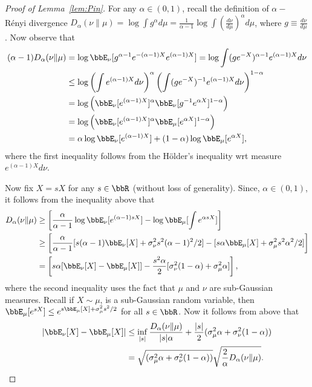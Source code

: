 \documentclass[11pt]{article}
\begin{document}
\begin{proof}[Proof of Lemma~\ref{lem:Pin}]
    For any $\alpha\in (0,1)$, recall the definition of $\alpha-$ R\'enyi divergence  $D_{\alpha}(\nu\|\mu)=   \log \int g^{\alpha}d\mu =\frac{1}{\alpha-1} {\log \int \left(\frac{d\nu}{d\mu}\right)^{\alpha}d\mu}   $, where $g\equiv \frac{d\nu}{d\mu}$. Now observe that
    \begin{align}
    \nonumber
       (\alpha-1) D_{\alpha}(\nu\| \mu) &= \log \bbE_{\nu}[ g^{\alpha-1} e^{-(\alpha-1)X} e^{(\alpha-1)X}  ] = \log \int (ge^{-X})^{\alpha-1}  e^{(\alpha-1)X} d\nu 
       \\
       \nonumber
       &\leq \log \left( \int   e^{(\alpha-1)X} d\nu \right)^{\alpha} \left(\int (ge^{-X})^{-1}  e^{(\alpha-1)X} d\nu \right)^{1-\alpha}
       \\
       \nonumber
       &= \log \left( \bbE_{\nu}[  e^{(\alpha-1)X}]^{\alpha} \bbE_{\nu}[g^{-1}  e^{\alpha X} ]^{1-\alpha} \right)
       \\
       \nonumber
       &= \log \left( \bbE_{\nu}[  e^{(\alpha-1)X}]^{\alpha} \bbE_{\mu}[ e^{\alpha X} ]^{1-\alpha} \right)
       \\
       &= \alpha \log \bbE_{\nu}[  e^{(\alpha-1)X}] + (1-\alpha) \log  \bbE_{\mu}[ e^{\alpha X} ],
    \end{align}
    where the first inequality follows from the H\"older's inequality wrt measure $e^{(\alpha-1)X} d\nu$.
    
    
    Now fix $X=s X$ for any $s\in \bbR$ (without loss of generality). Since, $\alpha\in(0,1)$, it follows from the inequality above that
    \begin{align}  
        \nonumber
        D_{\alpha}(\nu\|\mu)  &\geq \left[ \frac{\alpha}{\alpha-1}\log \bbE_{\nu} [e^{(\alpha-1)sX} ] - \log \bbE_{\mu}[\int e^{\alpha sX} ] \right] 
        \\
        \nonumber
        &\geq \left[ \frac{\alpha}{\alpha-1}[s(\alpha-1)\bbE_{\nu}[X]+\sigma_{\nu}^2s^2(\alpha-1)^2/2] - [s\alpha\bbE_{\mu}[X]+\sigma_{\mu}^2s^2\alpha^2/2]\right] 
        \\
        &= \left[ s\alpha[\bbE_{\nu}[X]-\bbE_{\mu}[X]] - \frac{s^2\alpha}{2}[\sigma_{\nu}^2(1-\alpha)+\sigma_{\mu}^2\alpha]\right] ,
    \end{align}
    where the second inequality uses the fact that $\mu$ and $\nu$ are sub-Gaussian measures.
    Recall if $X\sim\mu$, is a sub-Gaussian random variable, then $\bbE_{\mu}[e^{sX}] \leq e^{s\bbE_{\mu}[X]+\sigma_{\mu}^2s^2/2}$ for all $s\in \bbR$.
    Now it follows from above that
    \begin{align}
        \nonumber
        |\bbE_{\nu}[X]-\bbE_{\mu}[X]  | &\leq \inf_{|s|} \frac{D_{\alpha}(\nu\|\mu)}{|s|\alpha} + \frac{|s|}{2}(\sigma_{\mu}^2\alpha+\sigma_{\nu}^2(1-\alpha))
        \\
        &= \sqrt{(\sigma_{\mu}^2\alpha+\sigma_{\nu}^2(1-\alpha))} \sqrt{\frac{2}{\alpha} D_{\alpha}(\nu\|\mu) }.
    \end{align}
    \end{proof}
\end{document}
